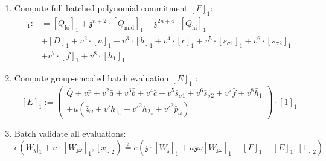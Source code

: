 \documentclass[fleqn]{article}
\begin{document}
\begin{enumerate}
				\item Compute full batched polynomial commitment $[F]_1$:
					\begin{align*}	            
					[F]_1:&= [Q_\text{lo}]_1+\mathfrak{z}^{n+2}\cdot[Q_\text{mid}]_1+\mathfrak{z}^{2n+4}\cdot[Q_\text{hi}]_1 \\ 
					&+[D]_1+v^2\cdot[a]_1+v^3\cdot[b]_1+v^4\cdot[c]_1+v^5\cdot[s_{\sigma 1}]_1+v^6\cdot[s_{\sigma 2}]_1 \\
					&+v^7\cdot[f]_1+v^8\cdot[h_1]_1
					\end{align*}
					            
				\item Compute group-encoded batch evaluation $[E]_1$ :    
					\[[E]_1 := \left(\begin{array}{ll}\bar{Q} +v\bar{r} + v^2\bar{a} + v^3\bar{b} + v^4\bar{c} +v^5\bar{s}_{\sigma 1} +v^6\bar{s}_{\sigma 2} +v^7\bar{f}+v^8\bar{h}_1 \\ 
					+u(\bar{z}_\omega+v'\bar{h}_{1_\omega} + v'^2\bar{h}_{2_\omega}+v'^3\bar{p}_\omega)\end{array}\right)\cdot[1]_1\]
					            
				\item Batch validate all evaluations:
					\[e({W_\mathfrak{z}]_1}+u\cdot[W_{\mathfrak{z}\omega}]_1, [x]_2) \stackrel{?}{=} e(\mathfrak{z}\cdot [W_\mathfrak{z}]_1+u\mathfrak{z}\omega[W_{\mathfrak{z}\omega}]_1 + [F]_1 - [E]_1, [1]_2)\]
			\end{enumerate}
\end{document}
